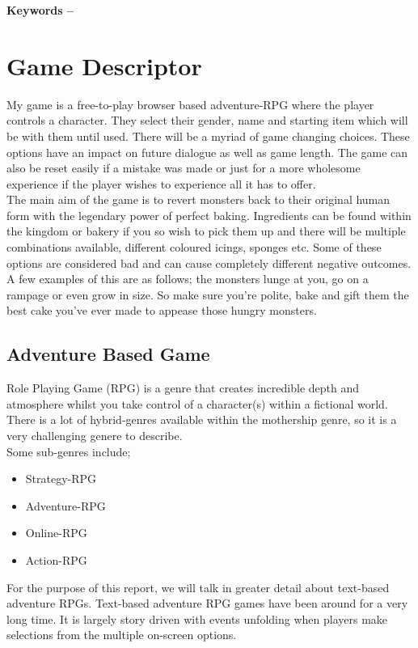 \documentclass[10pt, a4paper]{article}
\title{\mytitle}
\author{\myauthor\hspace{1em}\\\contact\\Edinburgh Napier University\hspace{0.5em}-\hspace{0.5em}\mymodule}
\date{}
\begin{document}
    \maketitle
    \begin{abstract}
        \lipsum[2]
    \end{abstract}
    
    \textbf{Keywords -- }{\mykeywords}
    
    \section{Game Descriptor}
	My game is a free-to-play browser based adventure-RPG where the player controls a character. They select their gender,
	name and starting item which will be with them until used. There will be a myriad of game changing choices. 
	These options have an impact on future dialogue as well as game length. The game can also be reset easily if a mistake
	was made or just for a more wholesome experience if the player wishes to experience all it has to offer. \\
    The main aim of the game is to revert monsters back to their original human form with the legendary power of perfect baking. Ingredients can be found within the kingdom or bakery if you so wish to pick them up and there will be multiple combinations available, different coloured icings, sponges etc. Some of these options are considered bad and can cause completely different negative outcomes. A few examples of this are as follows; the monsters lunge at you, go on a rampage or even grow in size. So make sure you're polite, bake and gift them the best cake you've ever made to appease those hungry monsters.
    
	\subsection{Adventure Based Game}
	Role Playing Game (RPG) is a genre that creates incredible depth and atmosphere whilst you take control of a character(s)
	within a fictional world. There is a lot of hybrid-genres available within the mothership genre, so it is a very
	challenging genere to describe.\\
	Some sub-genres include; 
	\begin{itemize}
		\item Strategy-RPG
		\item Adventure-RPG
		\item Online-RPG
		\item Action-RPG
	\end{itemize}
	For the purpose of this report, we will talk in greater detail about text-based adventure RPGs.
	Text-based adventure RPG games have been around for a very long time. It is largely story driven
	with events unfolding when players make selections from the multiple on-screen options.
	
\end{document}
